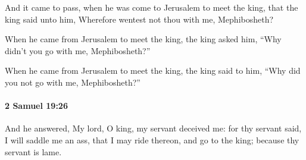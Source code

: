 			\begin{versebox}
					\item[BHS] 
					\item[ASV] And it came to pass, when he was come to Jerusalem to meet the king, that the king said unto him, Wherefore wentest not thou with me, Mephibosheth?
					\item[NIV] When he came from Jerusalem to meet the king, the king asked him, “Why didn’t you go with me, Mephibosheth?”
					\item[NRSV] When he came from Jerusalem to meet the king, the king said to him, “Why did you not go with me, Mephibosheth?”
			\end{versebox}

		\paragraph{2 Samuel 19:26} %
			\label{2SAMUEL-19-26}

			And he answered, My lord, O king, my servant deceived me: for thy servant said, I will saddle me an ass, that I may ride thereon, and go to the king; because thy servant is lame.

